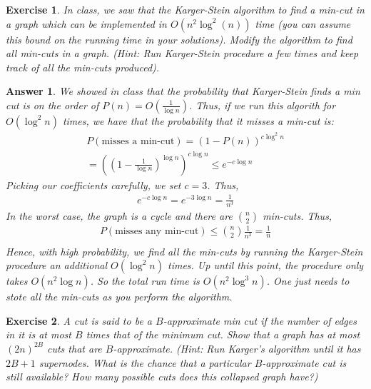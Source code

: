 \documentclass[12pt]{article}
\theoremstyle{colon}
\newtheorem{exercise}{Exercise}
\newtheorem*{answer}{Answer}
\begin{document}
\clearpage

\begin{exercise}
  In class, we saw that the Karger-Stein algorithm to find a min-cut in a graph which can be implemented in $O(n^2 \log^2(n))$ time (you can assume this bound on the running time in your solutions). Modify the algorithm to find \textit{all} min-cuts in a graph. (Hint: Run Karger-Stein procedure a few times and keep track of all the min-cuts produced).
\end{exercise}

\begin{answer}
  We showed in class that the probability that Karger-Stein finds a min cut is on the order of $P(n) = O(\frac{1}{\log n})$. Thus, if we run this algorith for $O(\log^2 n)$ times, we have that the probability that it misses a min-cut is:
  \begin{gather*}
    P(\text{misses a min-cut}) = (1-P(n))^{c \log^2 n} \\
    = \left( \left(1-\frac{1}{\log n} \right)^{\log n} \right)^{c \log n} \leq e^{-c \log n}
  \end{gather*}
  Picking our coefficients carefully, we set $c = 3$. Thus,
  \begin{gather*}
    e^{-c \log n} = e^{-3 \log n} = \frac{1}{n^3}
  \end{gather*}
  In the worst case, the graph is a cycle and there are $\binom{n}{2}$ min-cuts. Thus,
  \begin{gather*}
    P(\text{misses any min-cut}) \leq \binom{n}{2} \frac{1}{n^3} = \frac{1}{n} \\
  \end{gather*}
  Hence, with high probability, we find all the min-cuts by running the Karger-Stein procedure an additional $O(\log^2 n)$ times. Up until this point, the procedure only takes $O(n^2 \log n)$. So the total run time is $O(n^2 \log^3 n)$. One just needs to stote all the min-cuts as you perform the algorithm.
\end{answer}

\clearpage

\begin{exercise}
  A cut is said to be a \textit{$B$-approximate min cut} if the number of edges in it is at most $B$ times that of the minimum cut. Show that a graph has at most $(2n)^{2B}$ cuts that are $B$-approximate. (Hint: Run Karger's algorithm until it has $2B + 1$ supernodes. What is the chance that a particular $B$-approximate cut is still available? How many possible cuts does this collapsed graph have?)
\end{exercise}
\end{document}
